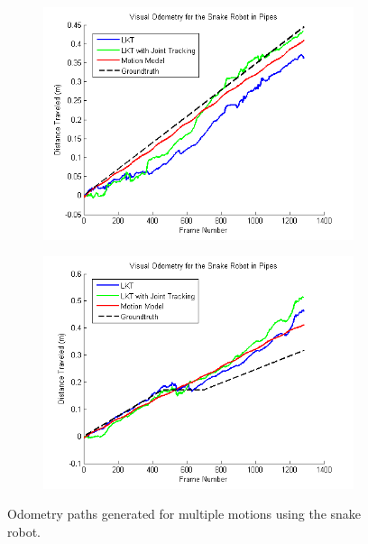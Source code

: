 \documentclass[letterpaper, 10 pt, conference]{ieeeconf}
\begin{document}
\begin{figure}[tb]
	\centering
	\begin{subfigure}{\columnwidth}
		  \centering
		  \includegraphics[width=\columnwidth]{trial8_path.png}
		  \label{snakes:trial8_path}
	\end{subfigure}
	\begin{subfigure}{\columnwidth}
		  \centering
		  \includegraphics[width=\columnwidth]{trial9_path.png}
		  \label{snakes:trial9_path}
	\end{subfigure}
	\caption{Odometry paths generated for multiple motions using the snake robot.}
    \label{snakes_path}
\end{figure}
\end{document}
